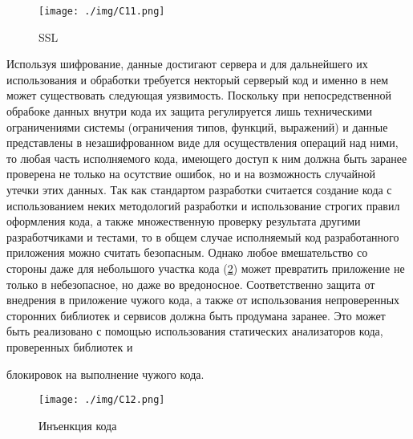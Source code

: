 \begin{figure}

\begin{center}

\texttt{[image: ./img/C11.png]}

\end{center}

\caption{SSL}

\label{pic:C11}

\end{figure}

Используя шифрование, данные достигают сервера и для дальнейшего их использования и обработки требуется некторый серверый код и именно в нем может существовать следующая уязвимость. Поскольку при непосредственной обрабоке данных внутри кода их защита регулируется лишь техническими ограничениями системы (ограничения типов, функций, выражений) и данные представлены в незашифрованном виде для осуществления операций над ними, то любая часть исполняемого кода, имеющего доступ к ним должна быть заранее проверена не только на осутствие ошибок, но и на возможность случайной утечки этих данных. Так как стандартом разработки считается создание кода с использованием неких методологий разработки и использование строгих правил оформления кода, а также множественную проверку результата другими разработчиками и тестами, то в общем случае исполняемый код разработанного приложения можно считать безопасным. Однако любое вмешательство со стороны даже для небольшого участка кода (\ref{pic:C12}) может превратить приложение не только в небезопасное, но даже во вредоносное. Соответственно защита от внедрения в приложение чужого кода, а также от использования непроверенных сторонних библиотек и сервисов должна быть продумана заранее. Это может быть реализовано с помощью использования статических анализаторов кода, проверенных библиотек и

блокировок на выполнение чужого кода.

\begin{figure}

\begin{center}

\texttt{[image: ./img/C12.png]}

\end{center}

\caption{Инъенкция кода}

\label{pic:C12}

\end{figure}

